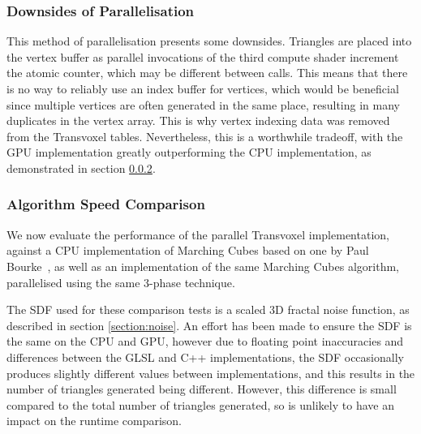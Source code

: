 \documentclass[11pt]{article}
\begin{document}
\subsubsection{Downsides of Parallelisation}
\label{section:downsides}
This method of parallelisation presents some downsides. Triangles are placed into the vertex buffer as parallel invocations of the third compute shader increment the atomic counter, which may be different between calls. This means that there is no way to reliably use an index buffer for vertices, which would be beneficial since multiple vertices are often generated in the same place, resulting in many duplicates in the vertex array. This is why vertex indexing data was removed from the Transvoxel tables. Nevertheless, this is a worthwhile tradeoff, with the GPU implementation greatly outperforming the CPU implementation, as demonstrated in section \ref{section:GPUCPUcomparison}.



\subsubsection{Algorithm Speed Comparison}
\label{section:GPUCPUcomparison}
We now evaluate the performance of the parallel Transvoxel implementation, against a CPU implementation of Marching Cubes based on one by Paul Bourke~\cite{bourke_1994}, as well as an implementation of the same Marching Cubes algorithm, parallelised using the same 3-phase technique.

The SDF used for these comparison tests is a scaled 3D fractal noise function, as described in section \ref{section:noise}. An effort has been made to ensure the SDF is the same on the CPU and GPU, however due to floating point inaccuracies and differences between the GLSL and C++ implementations, the SDF occasionally produces slightly different values between implementations, and this results in the number of triangles generated being different. However, this difference is small compared to the total number of triangles generated, so is unlikely to have an impact on the runtime comparison.
\end{document}

